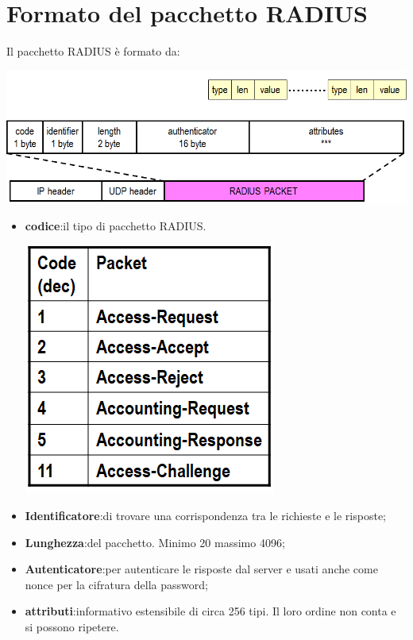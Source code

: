 \documentclass{book}
\theoremstyle{remark}
\begin{document}
\section{Formato del pacchetto RADIUS}
Il pacchetto RADIUS è formato da:\begin{center}
	\includegraphics[scale=0.4]{packetFormat.png}
\end{center}\begin{itemize}
	\item \textbf{codice}:\@rappresenta il tipo di pacchetto RADIUS\@.\begin{center}
		      \includegraphics[scale=0.4]{codesRADIUS.png}
	      \end{center}
	\item \textbf{Identificatore}:\@permettere di trovare una corrispondenza tra le richieste e le risposte;\@
	\item \textbf{Lunghezza}:\@lunghezza del pacchetto\@. Minimo 20 massimo 4096;\@
	\item \textbf{Autenticatore}:\@utilizzato per autenticare le risposte dal server e usati anche come nonce per la cifratura della password;\@
	\item \textbf{attributi}:\@campo informativo estensibile di circa 256 tipi\@. Il loro ordine non conta e si possono ripetere\@.
\end{itemize}
\end{document}
